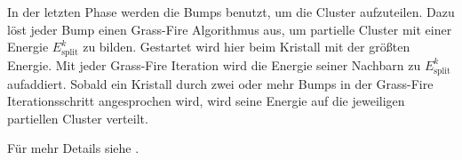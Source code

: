 \documentclass[a4paper,11pt,oneside,final,german,openbib,pdftex]{scrbook}
\begin{document}
{ In der letzten Phase werden die Bumps benutzt, um die Cluster aufzuteilen. Dazu l\"ost jeder Bump einen Grass-Fire Algorithmus aus, um partielle Cluster mit einer Energie $E^k_{\text{split}}$ zu bilden. Gestartet wird hier beim Kristall mit der gr\"o{\ss}ten Energie. Mit jeder Grass-Fire Iteration wird die Energie seiner Nachbarn zu $E^k_\text{{split}}$ aufaddiert. Sobald ein Kristall durch zwei oder mehr Bumps in der Grass-Fire Iterationsschritt angesprochen wird, wird seine Energie auf die jeweiligen partiellen Cluster verteilt.   
 
 F\"ur mehr Details siehe \cite{Ne17}.
 

}
\end{document}
